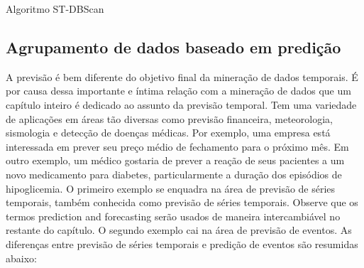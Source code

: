 \pagebreak
\begin{algorithm}[h!]
	\SetSpacedAlgorithm
	\caption{\label{alg:algoritmo_stdbscan}Algoritmo ST-DBScan}
\end{algorithm}

\subsection{Agrupamento de dados baseado em predição}
A previsão é bem diferente do objetivo final da mineração de dados temporais. É por causa dessa importante e íntima relação com a mineração de dados que um capítulo inteiro é dedicado ao assunto da previsão temporal. Tem uma variedade de aplicações em áreas tão diversas como previsão financeira, meteorologia, sismologia e detecção de doenças médicas. Por exemplo, uma empresa está interessada em prever seu preço médio de fechamento para o próximo mês. Em outro exemplo, um médico gostaria de prever a reação de seus pacientes a um novo medicamento para diabetes, particularmente a duração dos episódios de hipoglicemia. O primeiro exemplo se enquadra na área de previsão de séries temporais, também conhecida como previsão de séries temporais. Observe que os termos prediction and forecasting serão usados de maneira intercambiável no restante do capítulo. O segundo exemplo cai na área de previsão de eventos. As diferenças entre previsão de séries temporais e predição de eventos são resumidas abaixo:

